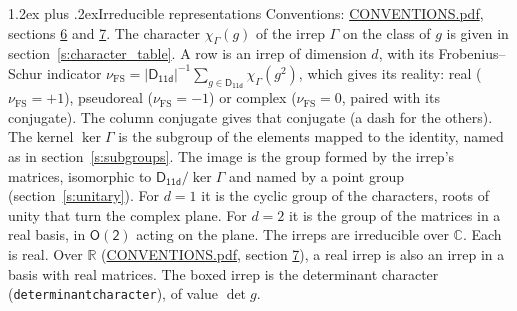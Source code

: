 \documentclass[10pt,a4paper]{article}
\makeatletter
\renewcommand\section{\@startsection{section}{1}{\z@}{-3ex plus -1ex minus -.2ex}%
  {1.2ex plus .2ex}{\normalfont\large\sffamily\bfseries\color{parttitle}}}
\numberwithin{equation}{section}
\newcommand{\grp}[1]{\mathsf{#1}}
\newcommand{\irchar}[1]{\chi_{#1}}
\newcommand{\fsind}{\nu_{\mathrm{FS}}}
\makeatother
\begin{document}
\section{Irreducible representations}\label{s:irreps}
Conventions: \href{../../CONVENTIONS.pdf}{CONVENTIONS.pdf}, sections \href{../../CONVENTIONS.pdf\#conv.6}{6} and \href{../../CONVENTIONS.pdf\#conv.7}{7}.
\leavevmode\label{n:function.character}\label{n:irrep.Gamma}The character $\irchar{\Gamma}(g)$ of the irrep $\Gamma$ on the class of $g$ is given in section~\ref{s:character_table}.
\leavevmode\label{n:index.dimension}\label{n:index.frobenius}\label{n:head.irrep}\label{n:head.reality}A row is an irrep of dimension $d$, with its Frobenius--Schur indicator $\fsind = |\grp{D_{11d}}|^{-1}\allowbreak\sum_{g\in\grp{D_{11d}}}\irchar{\Gamma}(g^2)$, which gives its reality: real ($\fsind = +1$), pseudoreal ($\fsind = -1$) or complex ($\fsind = 0$, paired with its conjugate). \label{n:head.conjugate}The column conjugate gives that conjugate (a dash for the others). \label{n:head.kernel}The kernel $\ker\Gamma$ is the subgroup of the elements mapped to the identity, named as in section~\ref{s:subgroups}. \label{n:head.image}The image is the group formed by the irrep's matrices, isomorphic to $\grp{D_{11d}}/\ker\Gamma$ and named by a point group (section~\ref{s:unitary}). For $d = 1$ it is the cyclic group of the characters, roots of unity that turn the complex plane. For $d = 2$ it is the group of the matrices in a real basis, in $\grp{O(2)}$ acting on the plane. The irreps are irreducible over $\mathbb{C}$. Each is real. Over $\mathbb{R}$ (\href{../../CONVENTIONS.pdf}{CONVENTIONS.pdf}, section \href{../../CONVENTIONS.pdf\#conv.7}{7}), a real irrep is also an irrep in a basis with real matrices. \label{n:mark.determinant}The boxed irrep is the determinant character (\texttt{determinantcharacter}), of value $\det g$.
\setlength{\emergencystretch}{2em}\par\setlength{\emergencystretch}{0pt}
\end{document}

